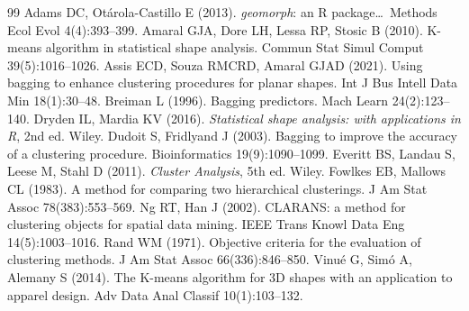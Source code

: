 \documentclass[11pt,a4paper]{article}
\begin{document}
\begin{thebibliography}{99}
\footnotesize
{} Adams DC, Otárola-Castillo E (2013). \textit{geomorph}: an R package\dots\ Methods Ecol Evol 4(4):393--399.
 Amaral GJA, Dore LH, Lessa RP, Stosic B (2010). K-means algorithm in statistical shape analysis. Commun Stat Simul Comput 39(5):1016--1026.
 Assis ECD, Souza RMCRD, Amaral GJAD (2021). Using bagging to enhance clustering procedures for planar shapes. Int J Bus Intell Data Min 18(1):30--48.
 Breiman L (1996). Bagging predictors. Mach Learn 24(2):123--140.
 Dryden IL, Mardia KV (2016). \textit{Statistical shape analysis: with applications in R}, 2nd ed. Wiley.
 Dudoit S, Fridlyand J (2003). Bagging to improve the accuracy of a clustering procedure. Bioinformatics 19(9):1090--1099.
 Everitt BS, Landau S, Leese M, Stahl D (2011). \textit{Cluster Analysis}, 5th ed. Wiley.
 Fowlkes EB, Mallows CL (1983). A method for comparing two hierarchical clusterings. J Am Stat Assoc 78(383):553--569.
 Ng RT, Han J (2002). CLARANS: a method for clustering objects for spatial data mining. IEEE Trans Knowl Data Eng 14(5):1003--1016.
 Rand WM (1971). Objective criteria for the evaluation of clustering methods. J Am Stat Assoc 66(336):846--850.
 Vinué G, Simó A, Alemany S (2014). The K-means algorithm for 3D shapes with an application to apparel design. Adv Data Anal Classif 10(1):103--132.
\end{thebibliography}
\end{document}

